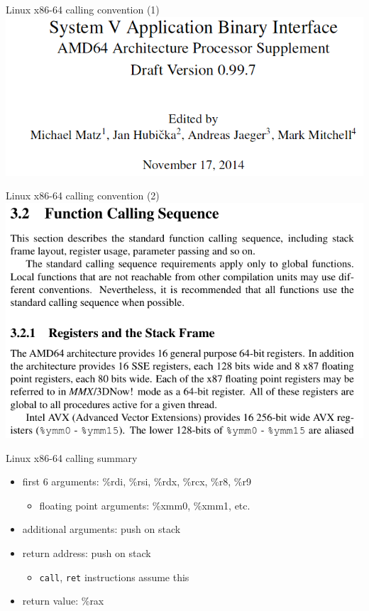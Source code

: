 \usetikzlibrary{arrows.meta,calc,matrix}

\begin{frame}{Linux x86-64 calling convention (1)}
    \includegraphics[width=\textwidth]{../asm/sysv-abi-front}
\end{frame}

\begin{frame}{Linux x86-64 calling convention (2)}
    \includegraphics[width=\textwidth]{../asm/func-call-seq-manual}
\end{frame}

\begin{frame}{Linux x86-64 calling summary}
\begin{itemize}
    \item first 6 arguments: \%rdi, \%rsi, \%rdx, \%rcx, \%r8, \%r9
        \begin{itemize}
        \item floating point arguments: \%xmm0, \%xmm1, etc.
        \end{itemize}
    \item additional arguments: push on stack
    \item return address: push on stack
        \begin{itemize}
        \item {\tt call}, {\tt ret} instructions assume this
        \end{itemize}
    \item return value: \%rax
\end{itemize}
\end{frame}



